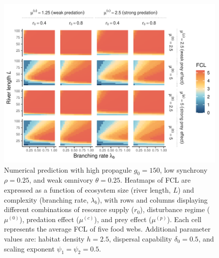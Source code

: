 \begin{figure}
\centering
\includegraphics{../data_fmt/fig_rho025_g150_theta025.pdf}
\caption{Numerical prediction with high propagule \(g_0 = 150\), low
synchrony \(\rho = 0.25\), and weak omnivory \(\theta = 0.25\). Heatmaps
of FCL are expressed as a function of ecosystem size (river length,
\(L\)) and complexity (branching rate, \(\lambda_b\)), with rows and
columns displaying different combinations of resource supply (\(r_0\)),
disturbance regime (\(\mu^{(0)}\)), predation effect (\(\mu^{(c)}\)),
and prey effect (\(\mu^{(p)}\)). Each cell represents the average FCL of
five food webs. Additional parameter values are: habitat density
\(h=2.5\), dispersal capability \(\delta_0=0.5\), and scaling exponent
\(\psi_1=\psi_2=0.5\).}
\end{figure}

\newpage

